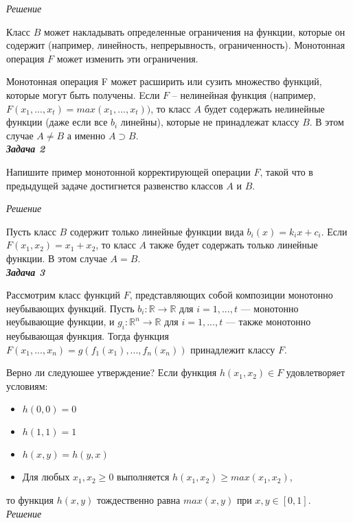 \textit{Решение}

Класс $B$ может накладывать определенные ограничения на функции, которые он содержит (например, линейность, непрерывность, ограниченность). Монотонная операция $F$ может изменить эти ограничения.

 Монотонная операция F может расширить или сузить множество функций, которые могут быть получены. Eсли $F$ – нелинейная функция (например, $F(x_1, ..., x_t) = max(x_1, ..., x_t))$, то класс $A$ будет содержать нелинейные функции (даже если все $b_i$ линейны), которые не принадлежат классу $B$. В этом случае $A \neq B$ а именно $A \supset B $.\\

\textbf{\emph{Задача 2}}

Напишите пример монотонной корректирующей операции $F$, такой что в предыдущей задаче достигнется развенство классов $A$ и $B$.


\textit{Решение}

Пусть класс $B$ содержит только линейные функции вида $b_i(x) = k_i x + c_i$. Если $F(x_1, x_2) = x_1 + x_2$, то класс $A$ также будет содержать только линейные функции. В этом случае $A = B$.\\

\textbf{\emph{Задача 3}}

Рассмотрим класс функций $F$, представляющих собой композиции монотонно неубывающих функций. Пусть $b_i: \mathbb{R} \rightarrow \mathbb{R}$ для $i = 1, ..., t$ — монотонно неубывающие функции, и $g_i: \mathbb{R}^n \rightarrow \mathbb{R}$ для $i = 1, ..., t$ — также монотонно неубывающая функция. Тогда функция $F(x_1, ..., x_n) = g(f_1(x_1), ..., f_n(x_n))$ принадлежит классу $F$.

Верно ли следуюшее утверждение? Если функция $h(x_1, x_2) \in F$ удовлетворяет условиям:

\begin{itemize}
\item $h(0, 0) = 0$
\item $h(1, 1) = 1$
\item $h(x, y) = h(y, x)$
\item Для любых $x_1, x_2 \geq 0$ выполняется $h(x_1, x_2) \geq max(x_1, x_2)$,

\end{itemize}


то функция $h(x, y)$ тождественно равна $max(x, y)$ при $x, y \in [0, 1]$.\\

\textit{Решение}

